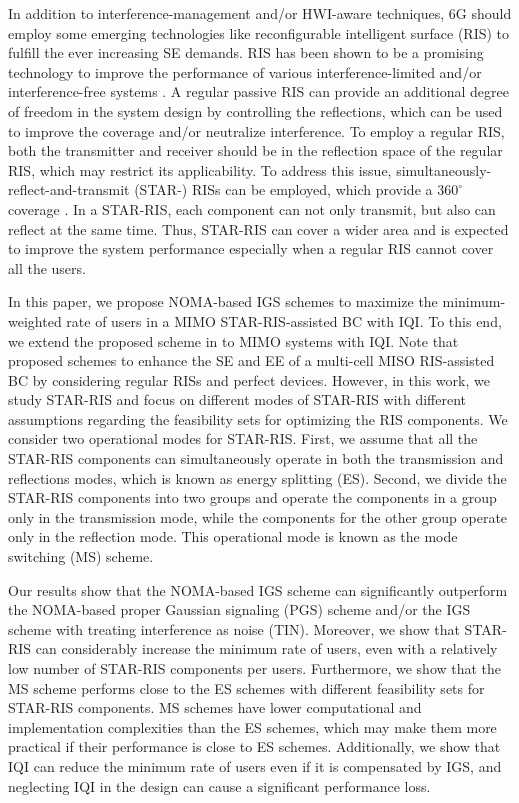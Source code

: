 \documentclass[a4, conference]{IEEEtran}
\theoremstyle{definition}
\begin{document}
In addition to  interference-management and/or HWI-aware techniques, 6G should employ some emerging technologies like reconfigurable intelligent surface (RIS) to fulfill the ever increasing SE demands. RIS has been shown to be a promising technology to improve the performance of various interference-limited and/or interference-free systems \cite{huang2019reconfigurable, wu2019intelligent, pan2020multicell, 
soleymani2022improper, weinberger2022synergistic, jiang2022interference, santamaria2023icassp}.
A regular passive RIS can provide an additional degree of freedom in the system design by controlling the reflections, which can be used to improve the coverage and/or neutralize interference. To employ a regular RIS, both the transmitter and receiver should be in the reflection space of the regular RIS, which may restrict its applicability. To address this issue, simultaneously-reflect-and-transmit (STAR-) RISs can be employed, which provide a $360^{\circ}$ coverage \cite{9774942, liu2022simultaneously, mu2021simultaneously, xu2021star, soleymani2023energy, soleymani2023spectral}.  In a STAR-RIS, each component can not only transmit, but also can reflect at the same time. Thus, STAR-RIS can cover a wider area and is expected to improve the system performance especially when a regular RIS cannot cover all the users. 

In this paper, we propose NOMA-based IGS schemes to maximize the minimum-weighted rate of users in a MIMO STAR-RIS-assisted BC with IQI. To this end, we extend the proposed scheme in \cite{soleymani2022noma} to MIMO systems with IQI. Note that \cite{soleymani2022noma} proposed schemes to enhance the SE and EE of a multi-cell MISO RIS-assisted BC by considering regular RISs and perfect devices. 
However, in this work, we study STAR-RIS and focus on different modes of STAR-RIS with different assumptions regarding the feasibility sets for optimizing the RIS components. 
We consider two operational modes for STAR-RIS. First, we assume that all the STAR-RIS components can simultaneously operate in both the transmission and reflections modes, which is known as energy splitting (ES). Second, we divide the STAR-RIS components into two groups and operate the components in a group only in the transmission mode, while the components for the other group operate only in the reflection mode. This operational mode is known as the mode switching (MS) scheme. 

Our results show that the NOMA-based IGS scheme can significantly outperform the NOMA-based proper Gaussian signaling (PGS) scheme and/or the IGS scheme with treating interference as noise (TIN).   Moreover, we show that  STAR-RIS can considerably increase the minimum rate of users, even with a relatively low number of STAR-RIS components per users. Furthermore, we show that the MS scheme performs close to the ES schemes with different feasibility sets for STAR-RIS components. MS schemes have lower computational and implementation complexities than the ES schemes, which may make them more practical if their performance is close to ES schemes.   
Additionally, we show that IQI can  reduce the minimum rate of users even if it is compensated by IGS, and neglecting IQI in the design can cause a significant performance loss. 
\end{document}
